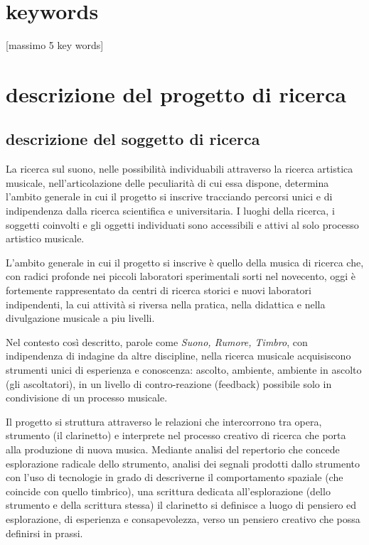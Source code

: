 \documentclass{gs-adonis}
\begin{document}
%
%


\section*{keywords}

[massimo 5 key words]


\section{descrizione del progetto di ricerca}%

\subsection{descrizione del soggetto di ricerca}%


La ricerca sul suono, nelle possibilità individuabili attraverso la ricerca
artistica musicale, nell'articolazione delle peculiarità di cui essa dispone,
determina l'ambito generale in cui il progetto si inscrive tracciando percorsi
unici e di indipendenza dalla ricerca scientifica e universitaria. I luoghi
della ricerca, i soggetti coinvolti e gli oggetti individuati sono accessibili
e attivi al solo processo artistico musicale.

L'ambito generale in cui il progetto si inscrive è quello della musica di
ricerca che, con radici profonde nei piccoli laboratori sperimentali sorti nel
novecento, oggi è fortemente rappresentato da centri di ricerca storici e
nuovi laboratori indipendenti, la cui attività si riversa nella pratica, nella
didattica e nella divulgazione musicale a piu livelli.

Nel contesto così descritto, parole come \emph{Suono, Rumore, Timbro},
con indipendenza di indagine da altre discipline, nella ricerca musicale
acquisiscono strumenti unici di esperienza e conoscenza: ascolto, ambiente,
ambiente in ascolto (gli ascoltatori), in un livello di contro-reazione
(feedback) possibile solo in condivisione di un processo musicale.

Il progetto si struttura attraverso le relazioni che intercorrono tra opera,
strumento (il clarinetto) e interprete nel processo creativo di ricerca che
porta alla produzione di nuova musica. Mediante analisi del repertorio che
concede esplorazione radicale dello strumento, analisi dei segnali prodotti
dallo strumento con l'uso di tecnologie in grado di descriverne il
comportamento spaziale (che coincide con quello timbrico), una scrittura
dedicata all'esplorazione (dello strumento e della scrittura stessa) il
clarinetto si definisce a luogo di pensiero ed esplorazione, di esperienza e
consapevolezza, verso un pensiero creativo che possa definirsi in prassi.
\end{document}
